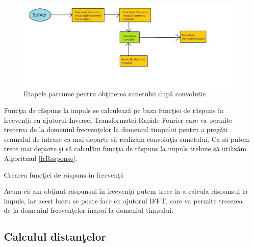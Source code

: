 	
	\begin{figure}[!htb]
		\centering
		\includegraphics[width=18cm]{imagini/conv.png}
		\caption{Etapele parcurse pentru ob\c{t}inerea sunetului după convoluție}
		\label{Fig15}
	\end{figure}
	
	Func\c{t}ia de r\u{a}spuns la impuls se calculeaz\u{a} pe baza func\c{t}iei de r\u{a}spuns \^{i}n frecven\c{t}\u{a} cu ajutorul Inversei Transformatei Rapide Fourier care va permite trecerea de la domeniul frecven\c{t}elor la domeniul timpului pentru a preg\u{a}ti semnalul de intrare ca mai departe s\u{a} realiz\u{a}m convolu\c{t}ia sunetului.
	Ca s\u{a} putem trece mai departe \c{s}i s\u{a} calcul\u{a}m func\c{t}ia de r\u{a}spuns la impuls trebuie s\u{a} utiliz\u{a}m Algoritmul \ref{frResponse}.
	
	\begin{algorithm}
		\caption{Crearea func\c{t}iei de r\u{a}spuns \^{i}n frecven\c{t}\u{a}}
		\label{frResponse}
		\begin{algorithmic}[3]	
			\EndFor
			\EndFor
			\EndProcedure
		\end{algorithmic}
	\end{algorithm}
	 
	
	Acum c\u{a} am ob\c{t}inut r\u{a}spunsul \^{i}n frecven\c{t}\u{a} putem trece la a calcula r\u{a}spunsul la impuls, iar acest lucru se poate face cu ajutorul IFFT, care va permite trecerea de la domeniul frecven\c{t}elor \^{i}napoi la domeniul timpului.
	
	\newpage
\subsection{Calculul distan\c{t}elor}

